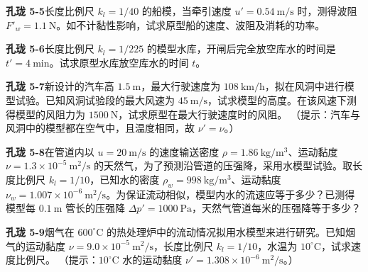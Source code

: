 \begin{ti}
\item \textbf{孔珑 5-5}\quad 长度比例尺 $k_l=1/40$ 的船模，当牵引速度 $u'=0.54\ \mathrm{m/s}$ 时，测得波阻 $F'_w=1.1\ \mathrm{N}$。如不计黏性影响，试求原型船的速度、波阻及消耗的功率。

\item \textbf{孔珑 5-6}\quad 长度比例尺 $k_l=1/225$ 的模型水库，开闸后完全放空库水的时间是 $t'=4\ \mathrm{min}$。试求原型水库放空库水的时间 $t$。

\item \textbf{孔珑 5-7}\quad 新设计的汽车高 $1.5\ \mathrm{m}$，最大行驶速度为 $108\ \mathrm{km/h}$，拟在风洞中进行模型试验。已知风洞试验段的最大风速为 $45\ \mathrm{m/s}$，试求模型的高度。在该风速下测得模型的风阻力为 $1500\ \mathrm{N}$，试求原型在最大行驶速度时的风阻。
（提示：汽车与风洞中的模型都在空气中，且温度相同，故 $\nu'=\nu$。）

\item \textbf{孔珑 5-8}\quad 在管道内以 $u=20\ \mathrm{m/s}$ 的速度输送密度 $\rho=1.86\ \mathrm{kg/m^3}$、运动黏度 $\nu=1.3\times10^{-5}\ \mathrm{m^2/s}$ 的天然气，为了预测沿管道的压强降，采用水模型试验。取长度比例尺 $k_l=1/10$，已知水的密度 $\rho_w=998\ \mathrm{kg/m^3}$、运动黏度 $\nu_w=1.007\times10^{-6}\ \mathrm{m^2/s}$。为保证流动相似，模型内水的流速应等于多少？已测得模型每 $0.1\ \mathrm{m}$ 管长的压强降 $\Delta p'=1000\ \mathrm{Pa}$，天然气管道每米的压强降等于多少？

\item \textbf{孔珑 5-9}\quad 烟气在 $600^{\circ}\mathrm{C}$ 的热处理炉中的流动情况拟用水模型来进行研究。已知烟气的运动黏度 $\nu=9.0\times10^{-5}\ \mathrm{m^2/s}$，长度比例尺 $k_l=1/10$，水温为 $10^{\circ}\mathrm{C}$，试求速度比例尺。
（提示：$10^{\circ}\mathrm{C}$ 水的运动黏度 $\nu'=1.308\times10^{-6}\ \mathrm{m^2/s}$。）


\end{ti}
